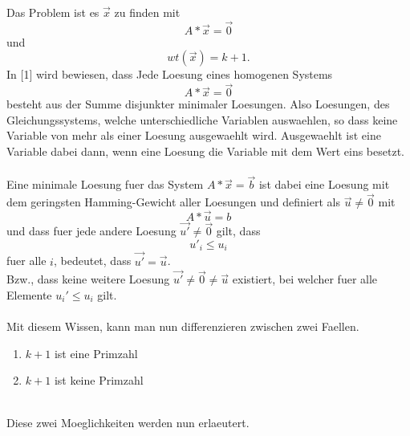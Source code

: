 \documentclass[a4paper,10pt,ngerman]{scrartcl}
\begin{document}
Das Problem ist es $\vec{x}$ zu finden mit\\
\[A * \vec{x} = \vec{0}\]
und
$$
wt(\vec{x}) = k + 1.
$$
In [1] wird bewiesen, dass Jede Loesung eines homogenen Systems
\[A * \vec{x} = \vec{0}\]
besteht aus der Summe disjunkter minimaler Loesungen. Also Loesungen, des Gleichungssystems, welche unterschiedliche Variablen auswaehlen, so dass keine Variable von mehr als einer Loesung ausgewaehlt wird. Ausgewaehlt ist eine Variable dabei dann, wenn eine Loesung die Variable mit dem Wert eins besetzt.\\
\\
Eine minimale Loesung fuer das System  $A * \vec{x} = \vec{b}$ ist dabei eine Loesung mit dem geringsten Hamming-Gewicht aller Loesungen und definiert als $\vec{u} \not= \vec{0}$ mit
$$
A * \vec{u} = b
$$
und dass fuer jede andere Loesung $\vec{u'} \not= \vec{0}$ gilt, dass
$$
u'_i \leq u_i
$$
fuer alle $i$, bedeutet, dass $\vec{u'} = \vec{u}$.
\\Bzw., dass keine weitere Loesung $\vec{u'} \not= \vec{0} \not= \vec{u}$ existiert, bei welcher fuer alle Elemente $ u_i' \leq u_i $ gilt.
\\\\
Mit diesem Wissen, kann man nun differenzieren zwischen zwei Faellen.\\
\begin{enumerate}
	\item $k+1$ ist eine Primzahl
	\item $k+1$ ist keine Primzahl
\end{enumerate}
\\
Diese zwei Moeglichkeiten werden nun erlaeutert.
\end{document}
